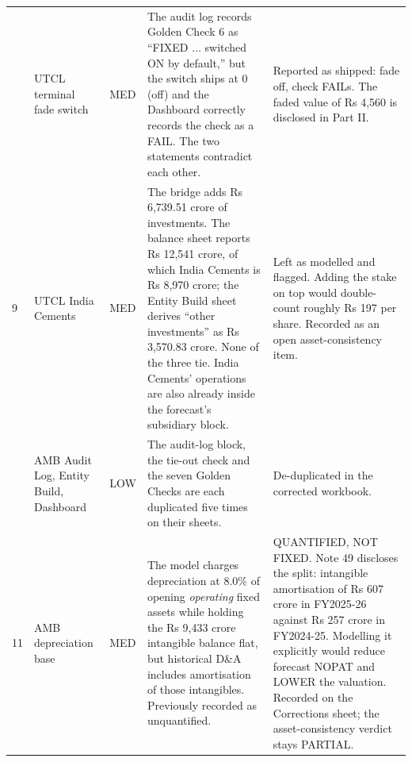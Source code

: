 {\begin{tabular}{@{}p{}p{}p{}p{}p{}@{}}
\arow 8 & UTCL terminal fade switch & MED & The audit log records Golden Check 6 as ``FIXED $\ldots$ switched ON by default,'' but the switch ships at 0 (off) and the Dashboard correctly records the check as a FAIL. The two statements contradict each other. & Reported as shipped: fade off, check FAILs. The faded value of Rs 4,560 is disclosed in Part II.\\
9 & UTCL India Cements & MED & The bridge adds Rs 6,739.51 crore of investments. The balance sheet reports Rs 12,541 crore, of which India Cements is Rs 8,970 crore; the Entity Build sheet derives ``other investments'' as Rs 3,570.83 crore. None of the three tie. India Cements' operations are also already inside the forecast's subsidiary block. & Left as modelled and flagged. Adding the stake on top would double-count roughly Rs 197 per share. Recorded as an open asset-consistency item.\\
\arow 10 & AMB Audit Log, Entity Build, Dashboard & LOW & The audit-log block, the tie-out check and the seven Golden Checks are each duplicated five times on their sheets. & De-duplicated in the corrected workbook.\\
11 & AMB depreciation base & MED & The model charges depreciation at 8.0\% of opening \emph{operating} fixed assets while holding the Rs 9,433 crore intangible balance flat, but historical D\&A includes amortisation of those intangibles. Previously recorded as unquantified. & QUANTIFIED, NOT FIXED. Note 49 discloses the split: intangible amortisation of Rs 607 crore in FY2025-26 against Rs 257 crore in FY2024-25. Modelling it explicitly would reduce forecast NOPAT and LOWER the valuation. Recorded on the Corrections sheet; the asset-consistency verdict stays PARTIAL.\\
\end{tabular}\par}

